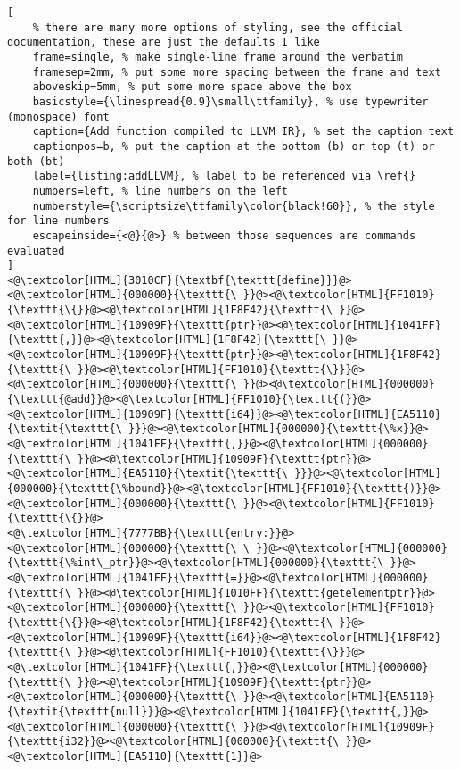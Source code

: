 \begin{lstlisting}[
	% there are many more options of styling, see the official documentation, these are just the defaults I like
	frame=single, % make single-line frame around the verbatim
	framesep=2mm, % put some more spacing between the frame and text
	aboveskip=5mm, % put some more space above the box
	basicstyle={\linespread{0.9}\small\ttfamily}, % use typewriter (monospace) font
	caption={Add function compiled to LLVM IR}, % set the caption text
	captionpos=b, % put the caption at the bottom (b) or top (t) or both (bt)
    label={listing:addLLVM}, % label to be referenced via \ref{}
	numbers=left, % line numbers on the left
	numberstyle={\scriptsize\ttfamily\color{black!60}}, % the style for line numbers
	escapeinside={<@}{@>} % between those sequences are commands evaluated
]
<@\textcolor[HTML]{3010CF}{\textbf{\texttt{define}}}@><@\textcolor[HTML]{000000}{\texttt{\ }}@><@\textcolor[HTML]{FF1010}{\texttt{\{}}@><@\textcolor[HTML]{1F8F42}{\texttt{\ }}@><@\textcolor[HTML]{10909F}{\texttt{ptr}}@><@\textcolor[HTML]{1041FF}{\texttt{,}}@><@\textcolor[HTML]{1F8F42}{\texttt{\ }}@><@\textcolor[HTML]{10909F}{\texttt{ptr}}@><@\textcolor[HTML]{1F8F42}{\texttt{\ }}@><@\textcolor[HTML]{FF1010}{\texttt{\}}}@><@\textcolor[HTML]{000000}{\texttt{\ }}@><@\textcolor[HTML]{000000}{\texttt{@add}}@><@\textcolor[HTML]{FF1010}{\texttt{(}}@><@\textcolor[HTML]{10909F}{\texttt{i64}}@><@\textcolor[HTML]{EA5110}{\textit{\texttt{\ }}}@><@\textcolor[HTML]{000000}{\texttt{\%x}}@><@\textcolor[HTML]{1041FF}{\texttt{,}}@><@\textcolor[HTML]{000000}{\texttt{\ }}@><@\textcolor[HTML]{10909F}{\texttt{ptr}}@><@\textcolor[HTML]{EA5110}{\textit{\texttt{\ }}}@><@\textcolor[HTML]{000000}{\texttt{\%bound}}@><@\textcolor[HTML]{FF1010}{\texttt{)}}@><@\textcolor[HTML]{000000}{\texttt{\ }}@><@\textcolor[HTML]{FF1010}{\texttt{\{}}@>
<@\textcolor[HTML]{7777BB}{\texttt{entry:}}@>
<@\textcolor[HTML]{000000}{\texttt{\ \ }}@><@\textcolor[HTML]{000000}{\texttt{\%int\_ptr}}@><@\textcolor[HTML]{000000}{\texttt{\ }}@><@\textcolor[HTML]{1041FF}{\texttt{=}}@><@\textcolor[HTML]{000000}{\texttt{\ }}@><@\textcolor[HTML]{1010FF}{\texttt{getelementptr}}@><@\textcolor[HTML]{000000}{\texttt{\ }}@><@\textcolor[HTML]{FF1010}{\texttt{\{}}@><@\textcolor[HTML]{1F8F42}{\texttt{\ }}@><@\textcolor[HTML]{10909F}{\texttt{i64}}@><@\textcolor[HTML]{1F8F42}{\texttt{\ }}@><@\textcolor[HTML]{FF1010}{\texttt{\}}}@><@\textcolor[HTML]{1041FF}{\texttt{,}}@><@\textcolor[HTML]{000000}{\texttt{\ }}@><@\textcolor[HTML]{10909F}{\texttt{ptr}}@><@\textcolor[HTML]{000000}{\texttt{\ }}@><@\textcolor[HTML]{EA5110}{\textit{\texttt{null}}}@><@\textcolor[HTML]{1041FF}{\texttt{,}}@><@\textcolor[HTML]{000000}{\texttt{\ }}@><@\textcolor[HTML]{10909F}{\texttt{i32}}@><@\textcolor[HTML]{000000}{\texttt{\ }}@><@\textcolor[HTML]{EA5110}{\texttt{1}}@>

\end{lstlisting}
